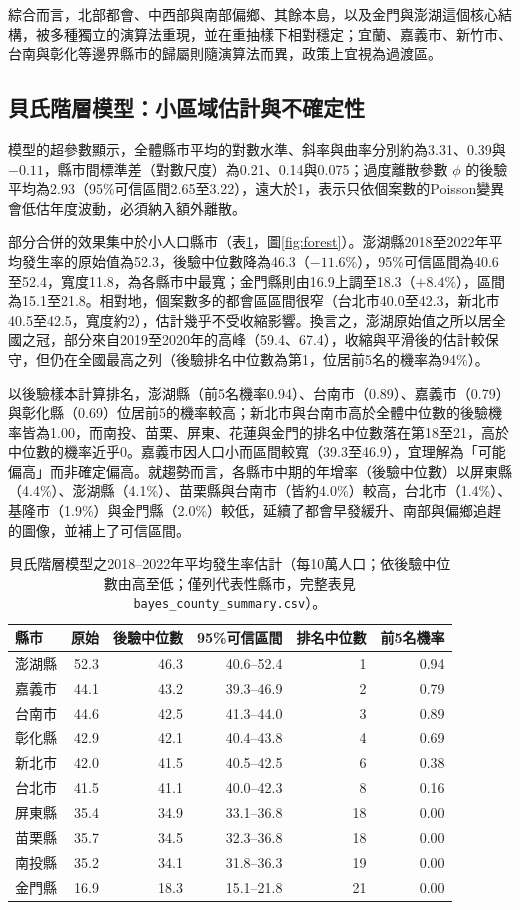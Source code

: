 \documentclass[UTF8,a4paper,11pt]{ctexart}
\begin{document}
綜合而言，北部都會、中西部與南部偏鄉、其餘本島，以及金門與澎湖這個核心結構，被多種獨立的演算法重現，並在重抽樣下相對穩定；宜蘭、嘉義市、新竹市、台南與彰化等邊界縣市的歸屬則隨演算法而異，政策上宜視為過渡區。

\subsection{貝氏階層模型：小區域估計與不確定性}
模型的超參數顯示，全體縣市平均的對數水準、斜率與曲率分別約為3.31、0.39與$-0.11$，縣市間標準差（對數尺度）為0.21、0.14與0.075；過度離散參數 $\phi$ 的後驗平均為2.93（95\%可信區間2.65至3.22），遠大於1，表示只依個案數的Poisson變異會低估年度波動，必須納入額外離散。

部分合併的效果集中於小人口縣市（表\ref{tab:bayes}，圖\ref{fig:forest}）。澎湖縣2018至2022年平均發生率的原始值為52.3，後驗中位數降為46.3（$-11.6\%$），95\%可信區間為40.6至52.4，寬度11.8，為各縣市中最寬；金門縣則由16.9上調至18.3（$+8.4\%$），區間為15.1至21.8。相對地，個案數多的都會區區間很窄（台北市40.0至42.3，新北市40.5至42.5，寬度約2），估計幾乎不受收縮影響。換言之，澎湖原始值之所以居全國之冠，部分來自2019至2020年的高峰（59.4、67.4），收縮與平滑後的估計較保守，但仍在全國最高之列（後驗排名中位數為第1，位居前5名的機率為94\%）。

以後驗樣本計算排名，澎湖縣（前5名機率0.94）、台南市（0.89）、嘉義市（0.79）與彰化縣（0.69）位居前5的機率較高；新北市與台南市高於全體中位數的後驗機率皆為1.00，而南投、苗栗、屏東、花蓮與金門的排名中位數落在第18至21，高於中位數的機率近乎0。嘉義市因人口小而區間較寬（39.3至46.9），宜理解為「可能偏高」而非確定偏高。就趨勢而言，各縣市中期的年增率（後驗中位數）以屏東縣（4.4\%）、澎湖縣（4.1\%）、苗栗縣與台南市（皆約4.0\%）較高，台北市（1.4\%）、基隆市（1.9\%）與金門縣（2.0\%）較低，延續了都會早發緩升、南部與偏鄉追趕的圖像，並補上了可信區間。

\begin{table}[H]
\centering
\caption{貝氏階層模型之2018--2022年平均發生率估計（每10萬人口；依後驗中位數由高至低；僅列代表性縣市，完整表見\texttt{bayes\_county\_summary.csv}）。}\label{tab:bayes}
\small
\begin{tabular}{lrrrrr}
\toprule
縣市 & 原始 & 後驗中位數 & 95\%可信區間 & 排名中位數 & 前5名機率\\
\midrule
澎湖縣 & 52.3 & 46.3 & 40.6--52.4 & 1 & 0.94\\
嘉義市 & 44.1 & 43.2 & 39.3--46.9 & 2 & 0.79\\
台南市 & 44.6 & 42.5 & 41.3--44.0 & 3 & 0.89\\
彰化縣 & 42.9 & 42.1 & 40.4--43.8 & 4 & 0.69\\
新北市 & 42.0 & 41.5 & 40.5--42.5 & 6 & 0.38\\
台北市 & 41.5 & 41.1 & 40.0--42.3 & 8 & 0.16\\
屏東縣 & 35.4 & 34.9 & 33.1--36.8 & 18 & 0.00\\
苗栗縣 & 35.7 & 34.5 & 32.3--36.8 & 18 & 0.00\\
南投縣 & 35.2 & 34.1 & 31.8--36.3 & 19 & 0.00\\
金門縣 & 16.9 & 18.3 & 15.1--21.8 & 21 & 0.00\\
\bottomrule
\end{tabular}
\end{table}
\end{document}
